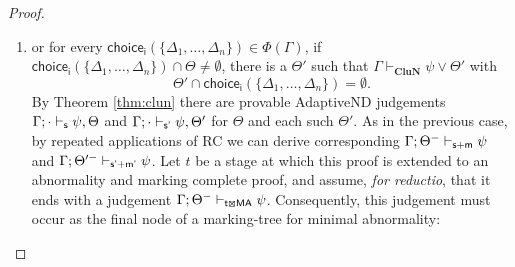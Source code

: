\documentclass[]{article}
\newcommand{\Turn}[2]
    { {#1}\vdash_{\textbf{\sf s}}  {#2}}
\newcommand{\TurnNextm}[2]
        { {#1}\vdash_{\textbf{\sf s+m}}  {#2}}
\newcommand{\TurnNextmPrime}[2]
        { {#1}\vdash_{\textbf{\sf s'+m'}}  {#2}}
\newcommand{\TurnPrime}[2]
    { {#1}\vdash_{\textbf{\sf s'}}  {#2}}
\newcommand{\TurnMarkedMAflex}[3]
    { {#2}\vdash_{\textbf{\sf {#1}\XBox MA}}  {#3}}
\begin{document}
\begin{proof}
\begin{itemize}
\begin{itemize}
\begin{enumerate}
To complete our argument, we rely on the fact that every choice-set derivable from $\Phi'(\Gamma)$ is used as a premise for the application of the marking-rule, but we do not need to assume that $\Phi'(\Gamma)$ is identical to $\Phi(\Gamma)$. Because $\Phi'(\Gamma)$ is derived at a stage of the proof that is already abnormality-complete, we know that $\{\Delta'_1, \ldots, \Delta'_m\} \subseteq \{\Delta_1, \ldots, \Delta_n\}$ (each $\Delta'_i$ is equal to some $\Delta_i$, but not vice-versa). Proposition \ref{prop:minchoice} then guarantees that each $\mathsf{choice_j}(\{\Delta_1, \ldots, \Delta_n\})$ is a superset of some $\mathsf{choice_i}(\{\Delta'_1, \ldots, \Delta'_m\})$. Consequently, since the marking at stage $t$ required that $\Theta \cap \mathsf{choice_i}(\{\Delta'_1, \ldots, \Delta'_m\}) \ne \emptyset$ for each choice-set in $\Phi'(\Gamma)$, it should also hold that $\Theta \cap \mathsf{choice_i}(\{\Delta_1, \ldots, \Delta_n\}) \ne \emptyset$ for each choice-set in $\Phi(\Gamma)$, which contradicts our initial assumption.

\item or for every $\mathsf{choice_i}(\{\Delta_1, \ldots, \Delta_n\})\in \Phi(\Gamma)$, if $\mathsf{choice_i}(\{\Delta_1, \ldots, \Delta_n\}) \cap \Theta \ne \emptyset$, there is a $\Theta'$ such that $\Gamma \vdash_{\mathbf{CluN}} \psi \vee \Theta'$ with
\[
    \Theta' \cap \mathsf{choice_i}(\{\Delta_1, \ldots, \Delta_n\}) = \emptyset.
\]
By Theorem \ref{thm:clun} there are provable {\sf AdaptiveND} judgements $\Turn{\Gamma;\cdot}{\psi,\Theta}$ and $\TurnPrime{\Gamma;\cdot}{\psi,\Theta'}$ for $\Theta$ and each such $\Theta'$. As in the previous case, by repeated applications of \textsc{RC} we can derive corresponding $\TurnNextm{\Gamma;\Theta^-}{\psi}$ and $\TurnNextmPrime{\Gamma;\Theta'^-}{\psi}$. Let $t$ be a stage at which this proof is extended to an abnormality and marking complete proof, and assume, \emph{for reductio}, that it ends with a judgement $\TurnMarkedMAflex{t}{\Gamma;\Theta^{-}}{\psi}$. Consequently, this judgement must occur as the final node of a marking-tree for minimal abnormality:


\end{enumerate}
\end{itemize}
\end{itemize}
\end{proof}
\end{document}
